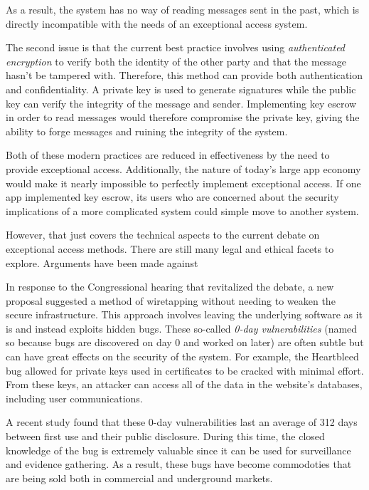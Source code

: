 \documentclass[12pt]{turabian-researchpaper}
\begin{document}
As a result, the system has no way of reading messages sent in the past, which is directly incompatible with the needs of an exceptional access system.

The second issue is that the current best practice involves using \textit{authenticated encryption} to verify both the identity of the other party and that the message hasn't be tampered with.
Therefore, this method can provide both authentication and confidentiality.
A private key is used to generate signatures while the public key can verify the integrity of the message and sender.
Implementing key escrow in order to read messages would therefore compromise the private key, giving the ability to forge messages and ruining the integrity of the system.

Both of these modern practices are reduced in effectiveness by the need to provide exceptional access.
Additionally, the nature of today's large app economy would make it nearly impossible to perfectly implement exceptional access.
If one app implemented key escrow, its users who are concerned about the security implications of a more complicated system could simple move to another system.

However, that just covers the technical aspects to the current debate on exceptional access methods. There are still many legal and ethical facets to explore. Arguments have been made against 

In response to the Congressional hearing that revitalized the debate, a new proposal suggested a method of wiretapping without needing to weaken the secure infrastructure.
This approach involves leaving the underlying software as it is and instead exploits hidden bugs.
These so-called \textit{0-day vulnerabilities} (named so because bugs are discovered on day 0 and worked on later) are often subtle but can have great effects on the security of the system.
For example, the Heartbleed bug allowed for private keys used in certificates to be cracked with minimal effort.
From these keys, an attacker can access all of the data in the website's databases, including user communications.

A recent study found that these 0-day vulnerabilities last an average of 312 days between first use and their public disclosure.
During this time, the closed knowledge of the bug is extremely valuable since it can be used for surveillance and evidence gathering.
As a result, these bugs have become commodoties that are being sold both in commercial and underground markets.
\end{document}
